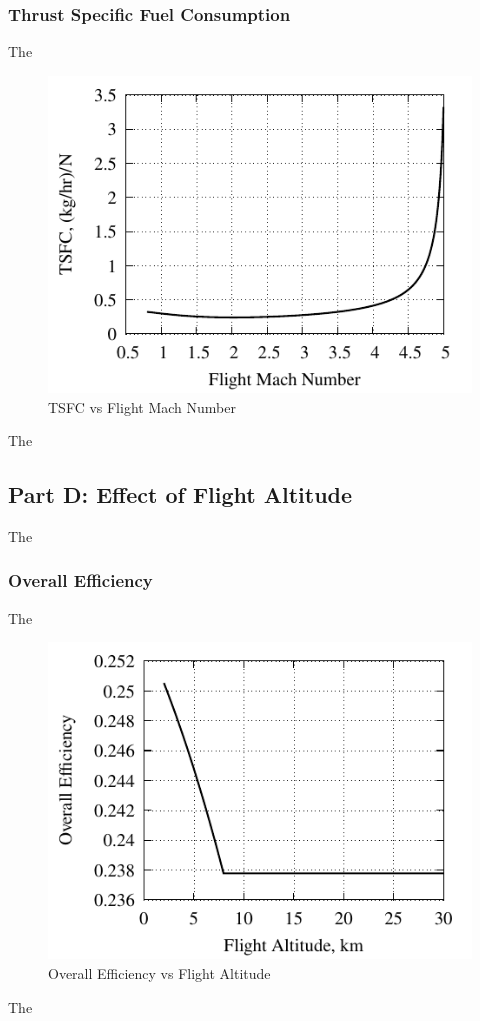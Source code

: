 \documentclass[conf]{new-aiaa} %
\begin{document}
\subsubsection{Thrust Specific Fuel Consumption}
The

\begin{figure}[hbt!]
\centering
\includegraphics[]{media/performance_parameter_files/part_c_TSFC.pdf}
\caption{\label{fig:partctsfc} TSFC vs Flight Mach Number}
\end{figure}
The

\subsection{Part D: Effect of Flight Altitude}
The

\subsubsection{Overall Efficiency}
The

\begin{figure}[hbt!]
\centering
\includegraphics[]{media/performance_parameter_files/part_d_eta_o.pdf}
\caption{\label{fig:partdetao} Overall Efficiency vs Flight Altitude}
\end{figure}
The
\end{document}
